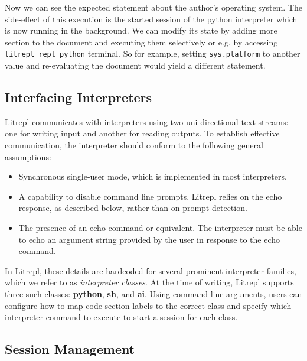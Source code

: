 \documentclass[a4paper,12pt,twocolumn]{article}
\begin{document}
Now we can see the expected statement about the author's operating system.  The
side-effect of this execution is the started session of the python interpreter
which is now running in the background. We can modify its state by adding more
section to the document and executing them selectively or e.g. by accessing
\verb|litrepl repl python| terminal. So for example, setting \verb|sys.platform|
to another value and re-evaluating the document would yield a different
statement.


\subsection{Interfacing Interpreters}

Litrepl communicates with interpreters using two uni-directional text streams:
one for writing input and another for reading outputs. To establish effective
communication, the interpreter should conform to the following general
assumptions:

\begin{itemize}
  \item Synchronous single-user mode, which is implemented in most interpreters.
  \item A capability to disable command line prompts. Litrepl relies on the echo
        response, as described below, rather than on prompt detection.
  \item The presence of an echo command or equivalent. The interpreter must be
        able to echo an argument string provided by the user in response to the
        echo command.
\end{itemize}

In Litrepl, these details are hardcoded for several prominent interpreter
families, which we refer to as \textit{interpreter classes}. At the time of
writing, Litrepl supports three such classes: \textbf{python}, \textbf{sh}, and
\textbf{ai}. Using command line arguments, users can configure how to map code
section labels to the correct class and specify which interpreter command to
execute to start a session for each class.

\subsection{Session Management}

\begin{comment}
\begin{sh}
echo -n '\begin' ; echo '{verbatim}'
echo '\begin{result}'
litrepl --python-auxdir=/tmp/litrepl/python restart python
{
cat <<EOF
import time
print('... some output ...')
time.sleep(9999)
EOF
}|litrepl --python-auxdir=/tmp/litrepl/python --timeout=1,inf eval-code python
echo '\end{result}'
echo -n '\end'; echo '{verbatim}'
\end{sh}
\end{comment}
\end{document}
